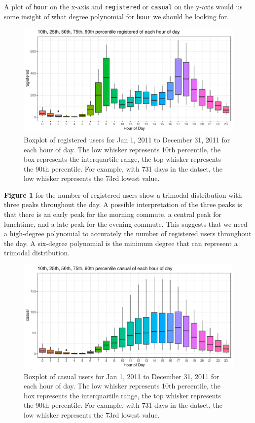 \documentclass[
]{article}
\begin{document}
A plot of \texttt{hour} on the x-axis and \texttt{registered} or
\texttt{casual} on the y-axis would us some insight of what degree
polynomial for \texttt{hour} we should be looking for.

\begin{figure}
\centering
\includegraphics{LeastSquares_files/figure-latex/unnamed-chunk-1-1.pdf}
\caption{Boxplot of registered users for Jan 1, 2011 to December 31,
2011 for each hour of day. The low whisker represents 10th percentile,
the box represents the interquartile range, the top whisker represents
the 90th percentile. For example, with 731 days in the datset, the low
whisker represents the 73rd lowest value.}
\end{figure}

\textbf{Figure 1} for the number of registered users show a trimodal
distribution with three peaks throughout the day. A possible
interpretation of the three peaks is that there is an early peak for the
morning commute, a central peak for lunchtime, and a late peak for the
evening commute. This suggests that we need a high-degree polynomial to
accurately the number of registered users throughout the day. A
six-degree polynomial is the minimum degree that can represent a
trimodal distribution.

\newpage

\begin{figure}
\centering
\includegraphics{LeastSquares_files/figure-latex/unnamed-chunk-2-1.pdf}
\caption{Boxplot of casual users for Jan 1, 2011 to December 31, 2011
for each hour of day. The low whisker represents 10th percentile, the
box represents the interquartile range, the top whisker represents the
90th percentile. For example, with 731 days in the datset, the low
whisker represents the 73rd lowest value.}
\end{figure}
\end{document}
